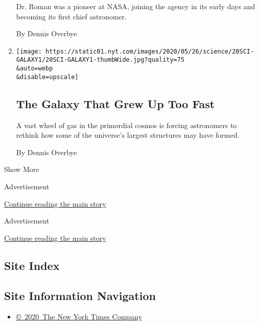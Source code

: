 \begin{enumerate}
  Dr. Roman was a pioneer at NASA, joining the agency in its early days
  and becoming its first chief astronomer.

  By Dennis Overbye
\item
  \href{/2020/05/20/science/galaxy-early-universe-astronomy.html}{}

  \texttt{[image: https://static01.nyt.com/images/2020/05/26/science/20SCI-GALAXY1/20SCI-GALAXY1-thumbWide.jpg?quality=75\\\&auto=webp\\\&disable=upscale]}

  \hypertarget{the-galaxy-that-grew-up-too-fast}{%
  \subsection{The Galaxy That Grew Up Too
  Fast}\label{the-galaxy-that-grew-up-too-fast}}

  A vast wheel of gas in the primordial cosmos is forcing astronomers to
  rethink how some of the universe's largest structures may have formed.

  By Dennis Overbye
\end{enumerate}

Show More

Advertisement

\protect\hyperlink{after-mid1}{Continue reading the main story}

Advertisement

\protect\hyperlink{after-mktg}{Continue reading the main story}

\hypertarget{site-index}{%
\subsection{Site Index}\label{site-index}}

\hypertarget{site-information-navigation}{%
\subsection{Site Information
Navigation}\label{site-information-navigation}}

\begin{itemize}
\tightlist
\item
  \href{https://help.nytimes.com/hc/en-us/articles/115014792127-Copyright-notice}{©~2020~The
  New York Times Company}
\end{itemize}

